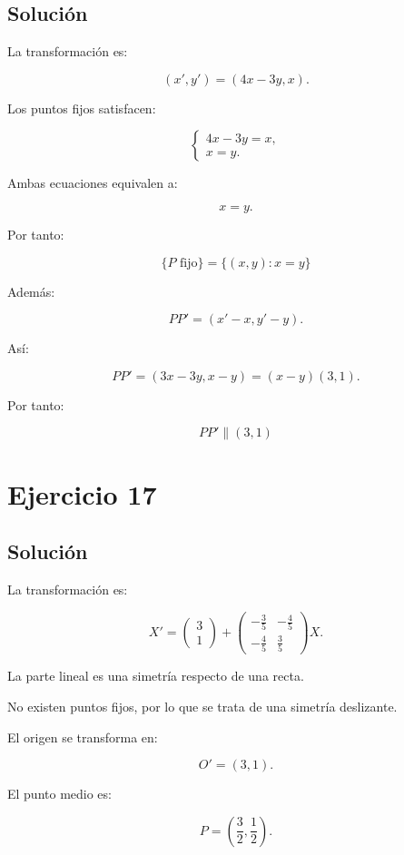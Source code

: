 \documentclass[11pt,a4paper]{article}
\begin{document}
\subsection{Solución}

La transformación es:

\[
(x',y')=(4x-3y,x).
\]

Los puntos fijos satisfacen:

\[
\begin{cases}
4x-3y=x,\\
x=y.
\end{cases}
\]

Ambas ecuaciones equivalen a:

\[
x=y.
\]

Por tanto:

\[
\boxed{
\{P\text{ fijo}\}
=
\{(x,y):x=y\}
}
\]

Además:

\[
PP'
=
(x'-x,y'-y).
\]

Así:

\[
PP'
=
(3x-3y,x-y)
=
(x-y)(3,1).
\]

Por tanto:

\[
\boxed{
PP'\parallel(3,1)
}
\]

\section{Ejercicio 17}
\subsection{Solución}

La transformación es:

\[
X'
=
\begin{pmatrix}
3\\
1
\end{pmatrix}
+
\begin{pmatrix}
-\frac35&-\frac45\\
-\frac45&\frac35
\end{pmatrix}
X.
\]

La parte lineal es una simetría respecto de una recta.

No existen puntos fijos, por lo que se trata de una simetría deslizante.

El origen se transforma en:

\[
O'=(3,1).
\]

El punto medio es:

\[
P=
\left(
\frac32,\frac12
\right).
\]
\end{document}
